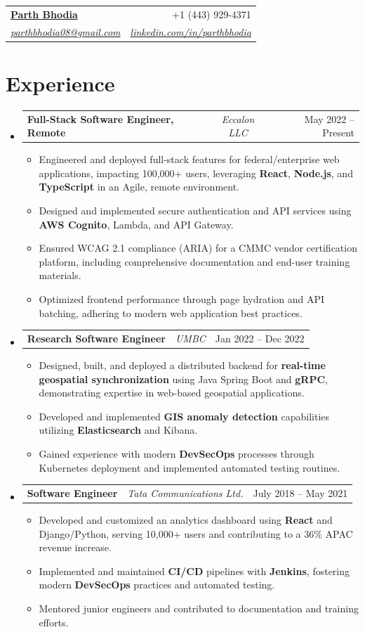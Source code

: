 \documentclass[a4paper,11pt]{article}
\makeatletter
\newcommand{\resumeItem}[1]{\item\small{#1}}
\newcommand{\resumeItemListStart}{\begin{itemize}[rightmargin=0.3in]}
\newcommand{\resumeItemListEnd}{\end{itemize}}
\newcommand{\resumeQuadHeading}[4]{
  \item
  \begin{tabular*}{0.96\textwidth}[t]{l@{\extracolsep{\fill}}r}
    \textbf{#1} & #2 \\
    \textit{\small#3} & \textit{\small #4} \\
  \end{tabular*}
}
\newcommand{\resumeTrioHeading}[3]{
  \item\small{
    \begin{tabular*}{0.96\textwidth}[t]{
      l@{\extracolsep{\fill}}c@{\extracolsep{\fill}}r
    }
      \textbf{#1} & \textit{#2} & #3
    \end{tabular*}
  }
}
\newcommand{\resumeHeadingListStart}{\begin{itemize}[leftmargin=0.15in, label={}]}
\newcommand{\resumeHeadingListEnd}{\end{itemize}}
\makeatother
\begin{document}
\resumeQuadHeading
  {\href{https://parthbhodia.com}{Parth Bhodia}} {+1 (443) 929-4371}
  {\href{mailto:parthbhodia08@gmail.com}{parthbhodia08@gmail.com}}
  {\href{https://linkedin.com/in/parthbhodia}{linkedin.com/in/parthbhodia}}

\section*{Experience}
  \resumeHeadingListStart
    \resumeTrioHeading
      {Full-Stack Software Engineer, Remote} {Eccalon LLC} {May 2022 – Present}
      \resumeItemListStart
        \resumeItem{Engineered and deployed full-stack features for federal/enterprise web applications, impacting 100,000+ users, leveraging \textbf{React}, \textbf{Node.js}, and \textbf{TypeScript} in an Agile, remote environment.}
        \resumeItem{Designed and implemented secure authentication and API services using \textbf{AWS Cognito}, Lambda, and API Gateway.}
        \resumeItem{Ensured WCAG 2.1 compliance (ARIA) for a CMMC vendor certification platform, including comprehensive documentation and end-user training materials.}
        \resumeItem{Optimized frontend performance through page hydration and API batching, adhering to modern web application best practices.}
      \resumeItemListEnd

    \resumeTrioHeading
      {Research Software Engineer} {UMBC} {Jan 2022 – Dec 2022}
      \resumeItemListStart
        \resumeItem{Designed, built, and deployed a distributed backend for \textbf{real-time geospatial synchronization} using Java Spring Boot and \textbf{gRPC}, demonstrating expertise in web-based geospatial applications.}
        \resumeItem{Developed and implemented \textbf{GIS anomaly detection} capabilities utilizing \textbf{Elasticsearch} and Kibana.}
        \resumeItem{Gained experience with modern \textbf{DevSecOps} processes through Kubernetes deployment and implemented automated testing routines.}
      \resumeItemListEnd

    \resumeTrioHeading
      {Software Engineer} {Tata Communications Ltd.} {July 2018 – May 2021}
      \resumeItemListStart
        \resumeItem{Developed and customized an analytics dashboard using \textbf{React} and Django/Python, serving 10,000+ users and contributing to a 36\% APAC revenue increase.}
        \resumeItem{Implemented and maintained \textbf{CI/CD} pipelines with \textbf{Jenkins}, fostering modern \textbf{DevSecOps} practices and automated testing.}
        \resumeItem{Mentored junior engineers and contributed to documentation and training efforts.}
      \resumeItemListEnd
  \resumeHeadingListEnd
\end{document}
